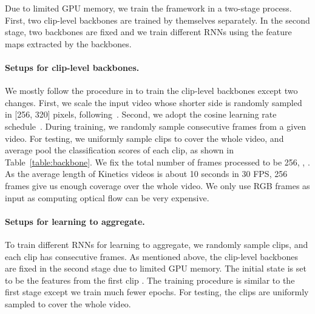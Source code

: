 \documentclass[10pt,twocolumn,letterpaper]{article}
\begin{document}
{{Due to limited GPU memory, we train the \oursfr framework in a two-stage process. First, two clip-level backbones are trained by themselves separately. In the second stage, two backbones are fixed and we train different RNNs using the feature maps extracted by the backbones.


\paragraph{Setups for clip-level backbones.}
We mostly follow the procedure in \cite{tran2018closer} to train the clip-level backbones except two changes. First, we scale the input video whose shorter
side is randomly sampled in [256, 320] pixels, following~\cite{wang2018non,simonyan2014very}. Second, we adopt the cosine learning rate schedule~\cite{loshchilov2016sgdr}. During training, we randomly sample  consecutive frames from a given video. For testing, we uniformly sample  clips to cover the whole video, and average pool the classification scores of each clip, as shown in Table~\ref{table:backbone}. We fix the total number of frames processed to be 256, \ie, . As the average length of Kinetics videos is about 10 seconds in 30 FPS, 256 frames give us enough coverage over the whole video. We only use RGB frames as input as computing optical flow can be very expensive.


\paragraph{Setups for learning to aggregate.}
To train different RNNs for learning to aggregate, we randomly sample  clips, and each clip has  consecutive frames. As mentioned above, the clip-level backbones are fixed  in the second stage due to limited GPU memory. The initial state  is set to be the features from the first clip . The training procedure is similar to the first stage except we train much fewer epochs. For testing, the  clips are uniformly sampled to cover the whole video.



}}
\end{document}
